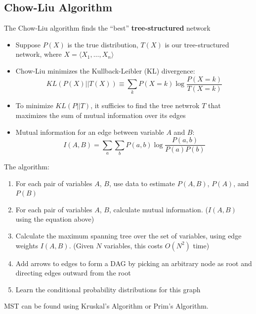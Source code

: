 \documentclass[10pt]{article}
\begin{document}
\subsection*{Chow-Liu Algorithm}
The Chow-Liu algorithm finds the ``best'' \textbf{tree-structured} network
\begin{itemize}
	\item Suppose $P(X)$ is the true distribution, $T(X)$ is our tree-structured network, where $X = \langle X_1, \dots, X_n \rangle$
	\item Chow-Liu minimizes the Kullback-Leibler (KL) divergence:
	\[KL(P(X) || T(X)) \equiv \sum_k P(X = k) \log \frac{P(X = k)}{T(X = k)}\]
    \item To minimize $KL(P || T)$, it sufficies to find the tree netwrok $T$ that maximizes the sum of mutual information over its edges
    \item Mutual information for an edge between variable $A$ and $B$:
    \[I(A, B) = \sum_a \sum_b P(a, b) \log \frac{P(a, b)}{P(a) P(b)}\]
\end{itemize}
The algorithm:
\begin{enumerate}
	\item For each pair of variables $A$, $B$, use data to estimate $P(A, B)$, $P(A)$, and $P(B)$
	\item For each pair of variables $A$, $B$, calculate mutual information.  ($I(A, B)$ using the equation above)
	\item Calculate the maximum spanning tree over the set of variables, using edge weights $I(A, B)$.  (Given $N$ variables, this costs $O(N^2)$ time)
	\item Add arrows to edges to form a DAG by picking an arbitrary node as root and directing edges outward from the root
	\item Learn the conditional probability distributions for this graph
\end{enumerate}
MST can be found using Kruskal's Algorithm or Prim's Algorithm.
\end{document}
